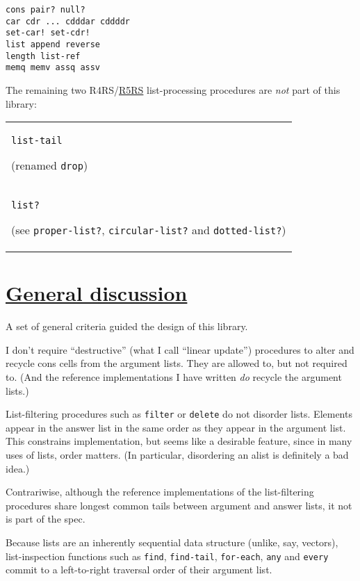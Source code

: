 \begin{verbatim}
cons pair? null?
car cdr ... cdddar cddddr 
set-car! set-cdr! 
list append reverse
length list-ref
memq memv assq assv
\end{verbatim}

The remaining two R4RS/\protect\hyperlink{R5RS}{R5RS} list-processing
procedures are \emph{not} part of this library:

\begin{longtable}[]{@{}l@{}}
\toprule
\begin{minipage}[t]{0.97\columnwidth}\raggedright\strut
\texttt{list-tail}

(renamed \texttt{drop})\strut
\end{minipage}\tabularnewline
\begin{minipage}[t]{0.97\columnwidth}\raggedright\strut
\texttt{list?}

(see \texttt{proper-list?}, \texttt{circular-list?} and
\texttt{dotted-list?})\strut
\end{minipage}\tabularnewline
\bottomrule
\end{longtable}

\section{\texorpdfstring{\href{}{General
discussion}}{General discussion}}\label{general-discussion}

A set of general criteria guided the design of this library.

I don't require ``destructive'' (what I call ``linear update'')
procedures to alter and recycle cons cells from the argument lists. They
are allowed to, but not required to. (And the reference implementations
I have written \emph{do} recycle the argument lists.)

List-filtering procedures such as \texttt{filter} or \texttt{delete} do
not disorder lists. Elements appear in the answer list in the same order
as they appear in the argument list. This constrains implementation, but
seems like a desirable feature, since in many uses of lists, order
matters. (In particular, disordering an alist is definitely a bad idea.)

Contrariwise, although the reference implementations of the
list-filtering procedures share longest common tails between argument
and answer lists, it not is part of the spec.

Because lists are an inherently sequential data structure (unlike, say,
vectors), list-inspection functions such as \texttt{find},
\texttt{find-tail}, \texttt{for-each}, \texttt{any} and \texttt{every}
commit to a left-to-right traversal order of their argument list.


